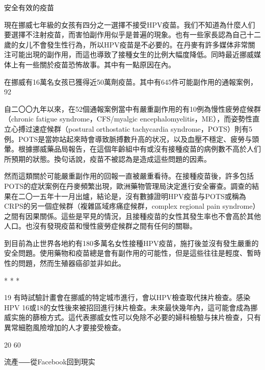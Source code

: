\documentclass[12pt,UTF8]{ctexbook}
\begin{document}
安全有效的疫苗




現在挪威七年級的女孩有四分之一選擇不接受HPV疫苗。我们不知道為什麼人们要選擇不注射疫苗，而害怕副作用似乎是普遍的現象。也有一些家長認為自己十二歲的女儿不會發生性行為，所以HPV疫苗是不必要的。在丹麥有許多媒体非常關注可能出現的副作用，而這也導致了接種女生的比例大幅度降低。同時最近挪威媒体上有一些關於疫苗恐怖故事。其中有一點原因在內。

在挪威有16萬名女孩已獲得近50萬劑疫苗。其中有645件可能副作用的通報案例，92%

自二〇〇九年以來，在52個通報案例當中有嚴重副作用的有10例為慢性疲勞症候群（chronic fatigue syndrome，CFS/myalgic encephalomyelitis，ME），而姿勢性直立心搏过速症候群（postural orthostatic tachycardia syndrome，POTS）則有5例。POTS是當妳站起來時會導致脈搏數升高的状况，以及血壓不穩定、疲勞与頭暈。根據挪威藥品局報告，在這個年齡組中有或沒有接種疫苗的病例數不高於人们所預期的狀態。換句话說，疫苗不被認為是造成這些問題的因素。

然而這類關於可能嚴重副作用的回報一直被嚴重看待。在接種疫苗後，許多包括POTS的症狀案例在丹麥頻繁出現，歐洲藥物管理局決定進行安全審查。調查的結果在二〇一五年十一月出爐，結论是，沒有數據證明HPV疫苗与POTS或稱為CRPS的另一個症候群（複雜區域疼痛症候群，complex regional pain syndrome）之間有因果關係。這些是罕見的情況，且接種疫苗的女性其發生率也不會高於其他人口。也沒有發現疫苗和慢性疲勞症候群之間有任何的關聯。

到目前為止世界各地約有180多萬名女性接種HPV疫苗，施打後並沒有發生嚴重的安全問題。使用藥物和疫苗總是會有副作用的可能性，但是這些往往是輕度、暫時性的問題，然而生殖器癌卻並非如此。





* * *



19	有時試驗計畫會在挪威的特定城市進行，會以HPV檢查取代抹片檢查。感染HPV 16或18的女性後來被招回進行抹片檢查。未來最快幾年內，這可能會成為挪威实施的篩檢方式。這代表挪威女性可以免除不必要的婦科檢驗与抹片檢查，只有異常細胞風險增加的人才要接受檢查。



20	60%





流產⸺從Facebook回到現实
\end{document}
